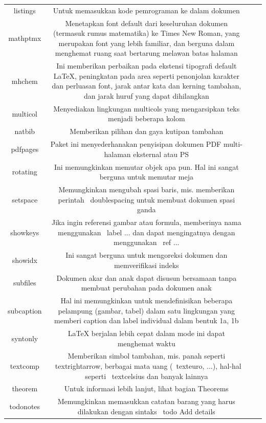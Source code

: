 \begin{table}[ht]
	\centering
	\begin{tabular}{cccc}
		listings&Untuk memasukkan kode pemrograman ke dalam dokumen&\\
		mathptmx&Menetapkan font default dari keseluruhan dokumen (termasuk rumus matematika) ke Times New Roman, yang merupakan font yang lebih familiar, dan berguna dalam menghemat ruang saat bertarung melawan batas halaman&\\
		mhchem&Ini memberikan perbaikan pada ekstensi tipografi default LaTeX, peningkatan pada area seperti penonjolan karakter dan perluasan font, jarak antar kata dan kerning tambahan, dan jarak huruf yang dapat dihilangkan&\\
		multicol&Menyediakan lingkungan multicols yang mengarsipkan teks menjadi beberapa kolom&\\
		natbib&Memberikan pilihan dan gaya kutipan tambahan&\\
		pdfpages&Paket ini menyederhanakan penyisipan dokumen PDF multi-halaman eksternal atau PS&\\
		rotating&Ini memungkinkan memutar objek apa pun. Hal ini sangat berguna untuk memutar meja&\\
		setspace&Memungkinkan mengubah spasi baris, mis. memberikan perintah \ doublespacing untuk membuat dokumen spasi ganda&\\
		showkeys&Jika ingin referensi gambar atau formula,  memberinya nama menggunakan \ label {...} dan dapat mengingatnya dengan menggunakan \ ref {...}&\\
		showidx&Ini sangat berguna untuk mengoreksi dokumen dan memverifikasi indeks&\\
		subfiles&Dokumen akar dan anak dapat disusun bersamaan tanpa membuat perubahan pada dokumen anak&\\
		subcaption&Hal ini memungkinkan untuk mendefinisikan beberapa pelampung (gambar, tabel) dalam satu lingkungan yang memberi caption dan label individual dalam bentuk 1a, 1b&\\
		syntonly&LaTeX berjalan lebih cepat dalam mode ini dapat menghemat waktu&\\
		textcomp&Memberikan simbol tambahan, mis. panah seperti \ textrightarrow, berbagai mata uang (\ texteuro, ...), hal-hal seperti \ textcelsius dan banyak lainnya&\\
		theorem& Untuk informasi lebih lanjut, lihat bagian Theorems&\\
		todonotes&Memungkinkan memasukkan catatan barang yang harus dilakukan dengan sintaks \ todo {Add details}&\\

\end{tabular}
\end{table}
